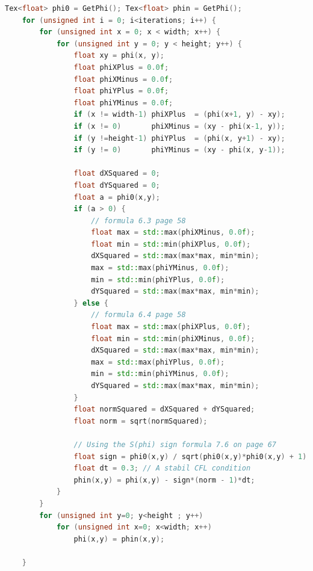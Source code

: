 \begin{lstlisting}[language=c++]
    Tex<float> phi0 = GetPhi(); Tex<float> phin = GetPhi();
    for (unsigned int i = 0; i<iterations; i++) {
        for (unsigned int x = 0; x < width; x++) {
            for (unsigned int y = 0; y < height; y++) {
                float xy = phi(x, y);                
                float phiXPlus = 0.0f;
                float phiXMinus = 0.0f;
                float phiYPlus = 0.0f;
                float phiYMinus = 0.0f;        	
                if (x != width-1) phiXPlus  = (phi(x+1, y) - xy);
                if (x != 0)       phiXMinus = (xy - phi(x-1, y));
                if (y !=height-1) phiYPlus  = (phi(x, y+1) - xy);
                if (y != 0)       phiYMinus = (xy - phi(x, y-1));
        	
                float dXSquared = 0;
                float dYSquared = 0;
                float a = phi0(x,y);
                if (a > 0) {
                    // formula 6.3 page 58
                    float max = std::max(phiXMinus, 0.0f);
                    float min = std::min(phiXPlus, 0.0f);
                    dXSquared = std::max(max*max, min*min);
                    max = std::max(phiYMinus, 0.0f);
                    min = std::min(phiYPlus, 0.0f);
                    dYSquared = std::max(max*max, min*min);
                } else {
                    // formula 6.4 page 58
                    float max = std::max(phiXPlus, 0.0f);
                    float min = std::min(phiXMinus, 0.0f);
                    dXSquared = std::max(max*max, min*min);
                    max = std::max(phiYPlus, 0.0f);
                    min = std::min(phiYMinus, 0.0f);
                    dYSquared = std::max(max*max, min*min);        				
                }
                float normSquared = dXSquared + dYSquared;           
                float norm = sqrt(normSquared);

                // Using the S(phi) sign formula 7.6 on page 67
                float sign = phi0(x,y) / sqrt(phi0(x,y)*phi0(x,y) + 1);
                float dt = 0.3; // A stabil CFL condition
                phin(x,y) = phi(x,y) - sign*(norm - 1)*dt;
            }
        }
        for (unsigned int y=0; y<height ; y++)
            for (unsigned int x=0; x<width; x++)
                phi(x,y) = phin(x,y);

    }
\end{lstlisting}

